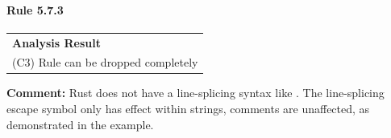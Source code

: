 \paragraph{Rule 5.7.3}
\begin{longtable}{p{13cm}}
\textbf{Analysis Result} \\
(C3) Rule can be dropped completely \\
\end{longtable}
\textbf{Comment:} Rust does not have a line-splicing syntax like \Cpp. The line-splicing\texttt{\\} escape symbol only has effect within strings, comments are unaffected, as demonstrated in the example. \\


